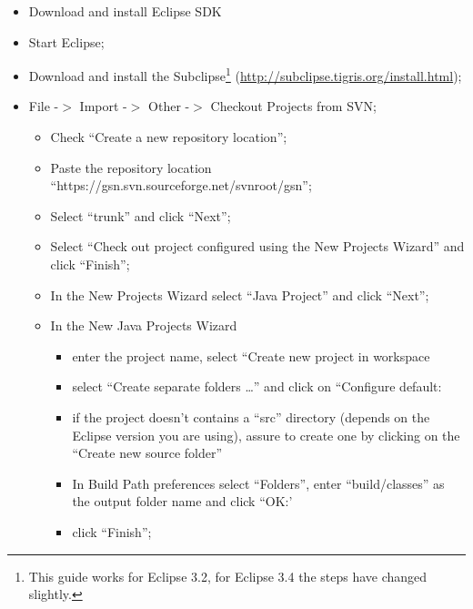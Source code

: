 \begin{itemize}
	\item Download and install Eclipse SDK
	\item Start Eclipse;
	\item Download and install the Subclipse\footnote{This guide works for Eclipse 3.2, for Eclipse 3.4 the steps have changed slightly.}
(\url{http://subclipse.tigris.org/install.html});
	\item File -\begin{math}>\end{math} Import -\begin{math}>\end{math} Other
-\begin{math}>\end{math} Checkout Projects from SVN;
\begin{itemize}
	\item Check \textquotedblleft{}Create a new repository
location\textquotedblright{};
	\item Paste the repository location
\textquotedblleft{}https://gsn.svn.sourceforge.net/svnroot/gsn\textquotedblright{};
	\item Select \textquotedblleft{}trunk\textquotedblright{} and click
\textquotedblleft{}Next\textquotedblright{};
	\item Select \textquotedblleft{}Check out project configured using the New
Projects Wizard\textquotedblright{} and click
\textquotedblleft{}Finish\textquotedblright{};
	\item In the New Projects Wizard select \textquotedblleft{}Java
Project\textquotedblright{} and click
\textquotedblleft{}Next\textquotedblright{};
	\item In the New Java Projects Wizard
\begin{itemize}
	\item enter the project name, select \textquotedblleft{}Create new project
in workspace
	\item select \textquotedblleft{}Create separate folders
\ldots{}\textquotedblright{} and click on \textquotedblleft{}Configure
default:
	\item if the project doesn't contains a \textquotedblleft{}src\textquotedblright{} directory (depends on the Eclipse version you are using), assure to create one by
		clicking on the \textquotedblleft{}Create new source folder\textquotedblright{}
	\item In Build Path preferences select
\textquotedblleft{}Folders\textquotedblright{}, enter
\textquotedblleft{}build/classes\textquotedblright{} as the output
folder name and click \textquotedblleft{}OK:'
	\item click \textquotedblleft{}Finish\textquotedblright{};
\end{itemize}


\end{itemize}
\end{itemize}
